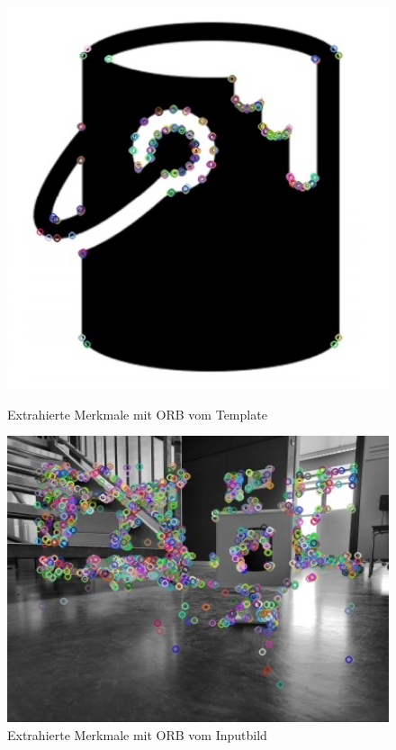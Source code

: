 \begin{figure}[H]
  \centering
  \begin{minipage}[t]{0.45\linewidth}
  \includegraphics[width=1.0\textwidth]{img/piktogrammerkennung/orb_kp1.jpg}
  \caption{Extrahierte Merkmale mit ORB vom Template}
  \label{fig:orb-kp1}
  \end{minipage} 
  \hfill
  \begin{minipage}[t]{0.45\linewidth}
  \includegraphics[width=1.0\textwidth]{img/piktogrammerkennung/orb_kp2.jpg}
  \caption{Extrahierte Merkmale mit ORB vom Inputbild}
  \label{fig:orb-kp2}
  \end{minipage}
\end{figure}


